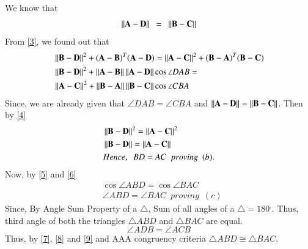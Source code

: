 \documentclass[journal,12pt,twocolumn]{IEEEtran}
\begin{document}
We know that
\begin{equation}\label{3}
	\left\lVert\mathbf{A}-\mathbf{D}\right\rVert\enspace = \enspace \left\lVert\mathbf{B}-\mathbf{C}\right\rVert 
\end{equation}
From \ref{3}, we found out that 
\begin{align}
&  \left\lVert\mathbf{B}-\mathbf{D}\right\rVert^2 + (\mathbf A -\mathbf B)^T(\mathbf{A}-\mathbf{D}) = \left\lVert\mathbf{A}-\mathbf{C}\right\rVert^2 + (\mathbf B -\mathbf A)^T(\mathbf{B}-\mathbf{C}) \\
& \left\lVert\mathbf{B}-\mathbf{D}\right\rVert^2 + \left\lVert\mathbf{A}-\mathbf{B}\right\rVert\left\lVert\mathbf{A}-\mathbf{D}\right\rVert\cos \angle DAB = \\
& \left\lVert\mathbf{A}-\mathbf{C}\right\rVert^2 + \left\lVert\mathbf{B}-\mathbf{A}\right\rVert\left\lVert\mathbf{B}-\mathbf{C}\right\rVert\cos \angle CBA \label{4}	
\end{align}
Since, we are already given that $\angle DAB = \angle CBA$ and $\left\lVert\mathbf{A}-\mathbf{D}\right\rVert = \left\lVert\mathbf{B}-\mathbf{C}\right\rVert$. Then by \ref{4}
\begin{align}
& \left\lVert\mathbf{B}-\mathbf{D}\right\rVert^2 = \left\lVert\mathbf{A}-\mathbf{C}\right\rVert^2 \\
& \left\lVert\mathbf{B}-\mathbf{D}\right\rVert = \left\lVert\mathbf{A}-\mathbf{C}\right\rVert \\
&Hence, \enspace BD =AC \enspace proving \enspace  (b). \label{5}
\end{align}
Now, by \ref{5} and \ref{6}
\begin{align}
	& \cos \angle ABD = \cos \angle BAC \\
	& \angle ABD = \angle BAC \enspace proving \enspace (c) \label{7}
\end{align} 
Since, By Angle Sum Property of a $\triangle$, Sum of all angles of a $\triangle = 180^.$. Thus, third angle of both the triangles $\triangle ABD$ and $\triangle BAC$ are equal.
\begin{equation}\label{8}
	\angle ADB = \angle ACB 
\end{equation}
Thus, by \ref{7}, \ref{8} and \ref{9} and AAA congruency criteria $\triangle ABD \cong \triangle BAC.$
\end{document}
